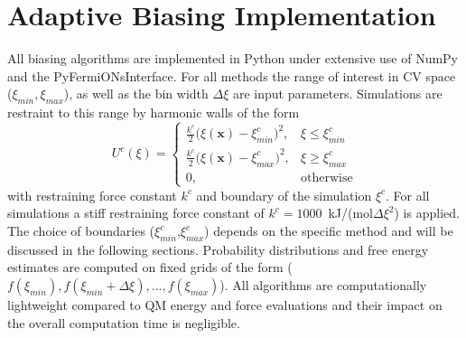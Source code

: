 \section{Adaptive Biasing Implementation}
\label{sec:comp ABM}
All biasing algorithms are implemented in Python under extensive use of NumPy\autocite{harris2020array} and the PyFermiONsInterface.
For all methods the range of interest in CV space ($\xi_{min},\xi_{max}$), as well as the bin width $\Delta\xi$ are input parameters.
Simulations are restraint to this range by harmonic walls of the form
\begin{equation}
U^c(\xi) =\left\{\begin{array}{ll} \frac{k^c}{2}\bigl(\xi(\textbf{x}) - \xi^c_{min} \bigr)^2, & \xi \leq \xi^c_{min} \\
                                   \frac{k^c}{2}\bigl(\xi(\textbf{x}) - \xi^c_{max} \bigr)^2, & \xi \geq \xi^c_{max} \\
                                    0, & \text{otherwise}
          \end{array}\right.
\label{eq:harmonic wall}
\end{equation}
with restraining force constant $k^c$ and boundary of the simulation $\xi^c$.
For all simulations a stiff restraining force constant of $k^c=1000$~kJ/(mol$\Delta\xi^2$) is applied. The choice of boundaries ($\xi^c_{min}$,$\xi^c_{max}$) depends on the specific method and will be discussed in the following sections.
Probability distributions and free energy estimates are computed on fixed grids of the form ($f(\xi_{min}),f(\xi_{min}+\Delta\xi),...,f(\xi_{max})$).
All algorithms are computationally lightweight compared to QM energy and force evaluations and their impact on the overall computation time is negligible.

